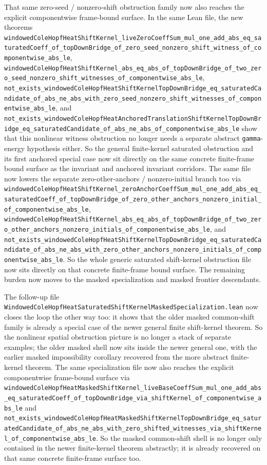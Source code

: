 \documentclass[11pt]{article}
\theoremstyle{remark}
\begin{document}
That same zero-seed / nonzero-shift obstruction family now also reaches the
explicit componentwise frame-bound surface.  In the same Lean file, the new
theorems
\texttt{windowedColeHopfHeatShiftKernel\_liveZeroCoeffSum\_mul\_one\_add\_abs\_eq\_saturatedCoeff\_of\_topDownBridge\_of\_zero\_seed\_nonzero\_shift\_witness\_of\_componentwise\_abs\_le},
\texttt{windowedColeHopfHeatShiftKernel\_abs\_eq\_abs\_of\_topDownBridge\_of\_two\_zero\_seed\_nonzero\_shift\_witnesses\_of\_componentwise\_abs\_le},
\texttt{not\_exists\_windowedColeHopfHeatShiftKernelTopDownBridge\_eq\_saturatedCandidate\_of\_abs\_ne\_abs\_with\_zero\_seed\_nonzero\_shift\_witnesses\_of\_componentwise\_abs\_le},
and
\texttt{not\_exists\_windowedColeHopfHeatAnchoredTranslationShiftKernelTopDownBridge\_eq\_saturatedCandidate\_of\_abs\_ne\_abs\_of\_componentwise\_abs\_le}
show that this nonlinear witness obstruction no longer needs a separate
abstract \texttt{gamma}-energy hypothesis either.  So the general
finite-kernel saturated obstruction and its first anchored special case now sit
directly on the same concrete finite-frame bound surface as the invariant and
anchored invariant corridors.  The same file now lowers the separate
zero-other-anchors / nonzero-initial branch too via
\texttt{windowedColeHopfHeatShiftKernel\_zeroAnchorCoeffSum\_mul\_one\_add\_abs\_eq\_saturatedCoeff\_of\_topDownBridge\_of\_zero\_other\_anchors\_nonzero\_initial\_of\_componentwise\_abs\_le},
\texttt{windowedColeHopfHeatShiftKernel\_abs\_eq\_abs\_of\_topDownBridge\_of\_two\_zero\_other\_anchors\_nonzero\_initials\_of\_componentwise\_abs\_le},
and
\texttt{not\_exists\_windowedColeHopfHeatShiftKernelTopDownBridge\_eq\_saturatedCandidate\_of\_abs\_ne\_abs\_with\_zero\_other\_anchors\_nonzero\_initials\_of\_componentwise\_abs\_le}.
So the whole generic saturated shift-kernel obstruction file now sits directly
on that concrete finite-frame bound surface.  The remaining burden now moves to
the masked specialization and masked frontier descendants.

The follow-up file
\texttt{WindowedColeHopfHeatSaturatedShiftKernelMaskedSpecialization.lean} now
closes the loop the other way too: it shows that the older masked common-shift
family is already a special case of the newer general finite shift-kernel
theorem.  So the nonlinear spatial obstruction picture is no longer a stack of
separate examples; the older masked shell now sits inside the newer general
one, with the earlier masked impossibility corollary recovered from the more
abstract finite-kernel theorem.  The same specialization file now also reaches
the explicit componentwise frame-bound surface via
\texttt{windowedColeHopfHeatMaskedShiftKernel\_liveBaseCoeffSum\_mul\_one\_add\_abs\_eq\_saturatedCoeff\_of\_topDownBridge\_via\_shiftKernel\_of\_componentwise\_abs\_le}
and
\texttt{not\_exists\_windowedColeHopfHeatMaskedShiftKernelTopDownBridge\_eq\_saturatedCandidate\_of\_abs\_ne\_abs\_with\_zero\_shifted\_witnesses\_via\_shiftKernel\_of\_componentwise\_abs\_le}.
So the masked common-shift shell is no longer only contained in the newer
finite-kernel theorem abstractly; it is already recovered on that same
concrete finite-frame surface too.
\end{document}
